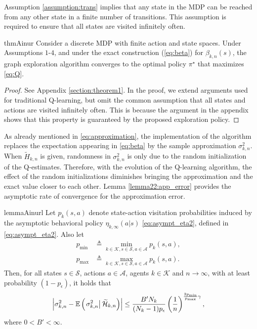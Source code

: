 \documentclass[lettersize,journal]{IEEEtran}
\begin{document}
Assumption \ref{assumption:trans} implies that any state in the MDP can be reached from any other state in a finite number of transitions. This assumption is required to ensure that all states are visited infinitely often.  %

\begin{restatable}{thm}{Ainur}
\label{theorem1}
Consider a discrete MDP with finite action and state spaces. Under Assumptions $1$-$4$, and under the exact construction (\ref{eq:beta}) for $\beta_{k,n}(s)$, the graph exploration algorithm   converges to the optimal policy $\pi^{\star}$ that maximizes \eqref{eq:Q}.

\end{restatable}
\begin{proof}
See Appendix \ref{section:theorem1}. In the proof, we extend arguments used for traditional Q-learning, but omit the common assumption that all states and actions are visited infinitely often. This is because the argument in the appendix shows that this property is guaranteed by the proposed exploration policy. \par 
\end{proof}
As already mentioned in \eqref{eq:approximation}, the implementation of the  algorithm replaces the expectation appearing in \eqref{eq:beta} by the sample approximation $\sigma_{k,n}^2$.  
 When $\widetilde{H}_{k,n}$ is given, randomness in $\sigma_{k,n}^2$ is only due to the random initialization of the Q-estimates. Therefore, with the evolution of the Q-learning algorithm, the effect of the random initializations diminishes bringing the approximation and the exact value closer to each other. Lemma \ref{lemma22:app_error} provides the asymptotic rate of convergence for the approximation error.     
\begin{restatable}{lemma}{Ainurl}
\label{lemma22:app_error}
 Let $p_{k}(s,a)$ denote 
state-action visitation probabilities induced by the asymptotic behavioral policy $\eta_{k,\infty}(a|s)$ \eqref{eq:asympt_eta2}, defined in \eqref{eq:asympt_eta2}. Also let  
\begin{align}
 p_{\min}&\triangleq \min\limits_{k\in \mathcal{K},s\in\mathcal{S},a\in\mathcal{A}}p_k(s,a),\\
 p_{\max}&\triangleq \max\limits_{k\in \mathcal{K},s\in\mathcal{S},a\in\mathcal{A}}p_k(s,a).
\end{align}
 Then, for all states $s\in\mathcal{S}$, actions $a\in\mathcal{A}$, agents $k\in\mathcal{K}$ and $n\to \infty$, with at least probability $(1-p_{\epsilon})$, it holds that
\begin{equation}
\label{eq:finite_time}
\Bigl|\sigma_{k,n}^2-\mathbb{E}\left (\left.\sigma_{k,n}^2\right|\widetilde{\mathcal{H}}_{k,n}\right)\Bigr| \leq \frac{B'N_k}{(N_k-1)p_{\epsilon}}\left(\frac{1}{n}\right)^{\frac{2p_{\min}}{p_{\max}}\gamma},
\end{equation}
 where  $0<B'<\infty$. 
\end{restatable}
\end{document}
